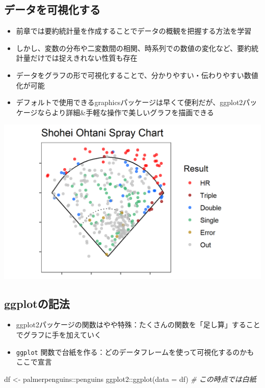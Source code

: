 \documentclass[
]{ltjsarticle}
\newenvironment{Shaded}{\begin{snugshade}}{\end{snugshade}}
\newcommand{\AttributeTok}[1]{\textcolor[rgb]{0.77,0.63,0.00}{#1}}
\newcommand{\CommentTok}[1]{\textcolor[rgb]{0.56,0.35,0.01}{\textit{#1}}}
\newcommand{\FunctionTok}[1]{\textcolor[rgb]{0.00,0.00,0.00}{#1}}
\newcommand{\NormalTok}[1]{#1}
\newcommand{\OtherTok}[1]{\textcolor[rgb]{0.56,0.35,0.01}{#1}}
\newcommand{\SpecialCharTok}[1]{\textcolor[rgb]{0.00,0.00,0.00}{#1}}
\providecommand{\tightlist}{%
  \setlength{\itemsep}{0pt}\setlength{\parskip}{0pt}}
\begin{document}
\hypertarget{ux30c7ux30fcux30bfux3092ux53efux8996ux5316ux3059ux308b}{%
\subsection{データを可視化する}\label{ux30c7ux30fcux30bfux3092ux53efux8996ux5316ux3059ux308b}}

\begin{itemize}
\tightlist
\item
  前章では要約統計量を作成することでデータの概観を把握する方法を学習
\item
  しかし、変数の分布や二変数間の相関、時系列での数値の変化など、要約統計量だけでは捉えきれない性質も存在
\item
  データをグラフの形で可視化することで、分かりやすい・伝わりやすい数値化が可能
\item
  デフォルトで使用できるgraphicsパッケージは早くて便利だが、ggplot2パッケージならより詳細\&手軽な操作で美しいグラフを描画できる
\end{itemize}

\begin{center}\includegraphics[width=0.5\linewidth]{figs/Ohtani_spray_total} \end{center}

\hypertarget{ggplotux306eux8a18ux6cd5}{%
\subsection{ggplotの記法}\label{ggplotux306eux8a18ux6cd5}}

\begin{itemize}
\tightlist
\item
  ggplot2パッケージの関数はやや特殊：たくさんの関数を「足し算」することでグラフに手を加えていく
\item
  \texttt{ggplot}
  関数で台紙を作る：どのデータフレームを使って可視化するのかもここで宣言
\end{itemize}

\begin{Shaded}
\begin{Highlighting}[]
\NormalTok{df }\OtherTok{\textless{}{-}}\NormalTok{ palmerpenguins}\SpecialCharTok{::}\NormalTok{penguins}
\NormalTok{ggplot2}\SpecialCharTok{::}\FunctionTok{ggplot}\NormalTok{(}\AttributeTok{data =}\NormalTok{ df) }\CommentTok{\# この時点では白紙}
\end{Highlighting}
\end{Shaded}
\end{document}
